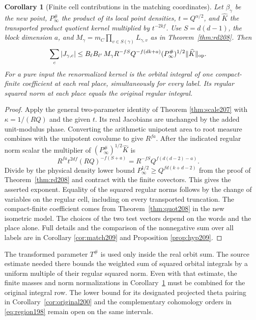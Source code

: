 \documentclass[a4paper,11pt]{article}
\newtheorem{corollary}[proposition]{Corollary}
\theoremstyle{definition}
\theoremstyle{remark}
\numberwithin{equation}{section}
\begin{document}
\begin{corollary}[Finite cell contributions in the matching coordinates]
\label{cor:match210}
Let \(\beta_\gamma\) be the new point, \(P_\infty^\#\) the
product of its local point densities, \(t=Q^{\alpha/2}\), and
\(\widehat K\) the transported product quotient kernel multiplied
by \(t^{-2kf}\). Use \(S=d(d-1)\), the block dimension \(a\),
and \(M_\gamma=m_C\prod_{v\in S(\gamma)}L_{\gamma,v}\) as in
Theorem~\ref{thm:rd208}. Then
\[
 \sum_c|J_{\gamma,c}|
   \le B_\ell B_{\ell'}\,M_\gamma R^{-fS}Q^{-f(dk+a)}
                 (P_\infty^\#)^{1/2}\|\widehat K\|_{\rm op}.
\]
For a pure input the renormalized kernel is the orbital integral
of one compact-finite coefficient at each real place, simultaneously
for every label. Its regular squared norm at each place equals
the original regular integral.
\end{corollary}
\begin{proof}
Apply the general two-parameter identity of
Theorem \ref{thm:scale207}
with \(\kappa=1/(RQ)\) and the given \(t\). Its real Jacobians
are unchanged by the added unit-modulus phase. Converting the
arithmetic unipotent area to root measure combines with the
unipotent covolume to give \(R^{fa}\). After the indicated
regular norm scalar the multiplier of
\((P_\infty^\#)^{1/2}\widehat K\) is
\[
          R^{fa}t^{2df}(RQ)^{-f(S+a)}
             = R^{-fS}Q^{f(d(d-2)-a)} .
\]
Divide by the physical density lower bound
\(P_\infty^{1/2}\ge Q^{fd(k+d-2)}\) from the proof of
Theorem~\ref{thm:rd208} and contract with the finite covectors.
This gives the asserted exponent. Equality of the squared
regular norms follows by the change of variables on the regular
cell, including on every transported truncation. The compact-finite
coefficient comes from Theorem~\ref{thm:quot208} in the new
isometric model. The choices of the two test vectors depend on
the words and the place alone. Full details and the comparison of
the nonnegative sum over all labels are in
Corollary \ref{cor:match209} and Proposition \ref{prop:hyp209}.
\end{proof}

The transformed parameter \(T^\#\) is used only inside the real
orbit sum. The source estimate needed there bounds the weighted
sum of squared orbital integrals by a uniform multiple of their
regular squared norm. Even with that estimate, the finite masses
and norm normalizations in Corollary~\ref{cor:match210} must be
combined for the original integral row. The lower bound for its
designated projected theta pairing in Corollary~\ref{cor:original200}
and the complementary cohomology orders in \eqref{eq:region198}
remain open on the same intervals.
\end{document}
